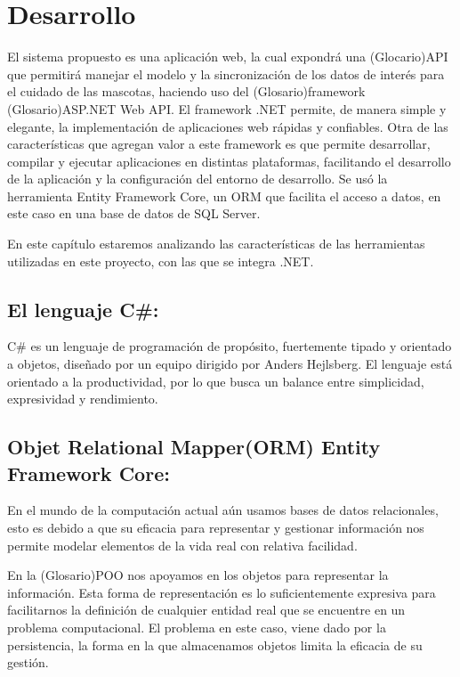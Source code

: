 \chapter{Desarrollo}\label{chapter:implementation}

El sistema propuesto es una aplicación web, la cual expondrá una (Glocario)API que permitirá manejar el modelo y la sincronización de los datos de interés para el cuidado de las mascotas, haciendo uso del (Glosario)framework (Glosario)ASP.NET Web API. El framework .NET permite, de manera simple y elegante, la implementación de aplicaciones web rápidas y confiables. Otra de las características que agregan valor a este framework es que permite desarrollar, compilar y ejecutar aplicaciones en distintas plataformas, facilitando el desarrollo de la aplicación y la configuración del entorno de desarrollo. Se usó la herramienta Entity Framework Core, un ORM que facilita el acceso a datos, en este caso en una base de datos de SQL Server.
\newline

En este capítulo estaremos analizando las características de las herramientas utilizadas en este proyecto, con las que se integra .NET.

\section{El lenguaje C\#:}

C\# es un lenguaje de programación de propósito, fuertemente tipado y orientado a objetos, diseñado por un equipo dirigido por Anders Hejlsberg. El lenguaje está orientado a la productividad, por lo que busca un balance entre simplicidad, expresividad y rendimiento.

\section{Objet Relational Mapper(ORM) Entity Framework Core:}

En el mundo de la computación actual aún usamos bases de datos relacionales, esto es debido a que su eficacia para representar y gestionar información nos permite modelar elementos de la vida real con relativa facilidad.

En la (Glosario)POO nos apoyamos en los objetos para representar la información. Esta forma de representación es lo suficientemente expresiva para facilitarnos la definición de cualquier entidad real que se encuentre en un problema computacional. El problema en este caso, viene dado por la persistencia, la forma en la que almacenamos objetos limita la eficacia de su gestión.
\newline

